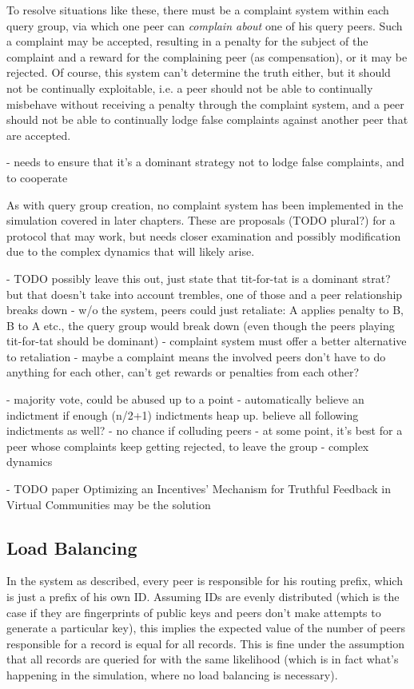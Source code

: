 To resolve situations like these, there must be a complaint system within each
query group, via which one peer can \emph{complain about} one of his query
peers. Such a complaint may be accepted, resulting in a penalty for the subject
of the complaint and a reward for the complaining peer (as compensation), or it
may be rejected. Of course, this system can't determine the truth either, but it
should not be continually exploitable, i.e. a peer should not be able to
continually misbehave without receiving a penalty through the complaint system,
and a peer should not be able to continually lodge false complaints against
another peer that are accepted.

- needs to ensure that it's a dominant strategy not to lodge false complaints,
  and to cooperate

As with query group creation, no complaint system has been implemented in the
simulation covered in later chapters. These are proposals (TODO plural?) for a
protocol that may work, but needs closer examination and possibly modification
due to the complex dynamics that will likely arise.

- TODO possibly leave this out, just state that tit-for-tat is a dominant strat?
  but that doesn't take into account trembles, one of those and a peer
  relationship breaks down
- w/o the system, peers could just retaliate: A applies penalty to B, B to A
  etc., the query group would break down (even though the peers playing
  tit-for-tat should be dominant)
- complaint system must offer a better alternative to retaliation
- maybe a complaint means the involved peers don't have to do anything for each
  other, can't get rewards or penalties from each other?

- majority vote, could be abused up to a point
- automatically believe an indictment if enough (n/2+1) indictments heap up.
  believe all following indictments as well?
- no chance if colluding peers
- at some point, it's best for a peer whose complaints keep getting rejected, to
  leave the group
- complex dynamics

- TODO paper Optimizing an Incentives’ Mechanism for Truthful Feedback in
  Virtual Communities may be the solution

\subsection{Load Balancing}
\label{sec:desc_load_balancing}
In the system as described, every peer is responsible for his routing prefix,
which is just a prefix of his own ID. Assuming IDs are evenly distributed (which
is the case if they are fingerprints of public keys and peers don't make
attempts to generate a particular key), this implies the expected value of the
number of peers responsible for a record is equal for all records. This is fine
under the assumption that all records are queried for with the same likelihood
(which is in fact what's happening in the simulation, where no load balancing is
necessary).

